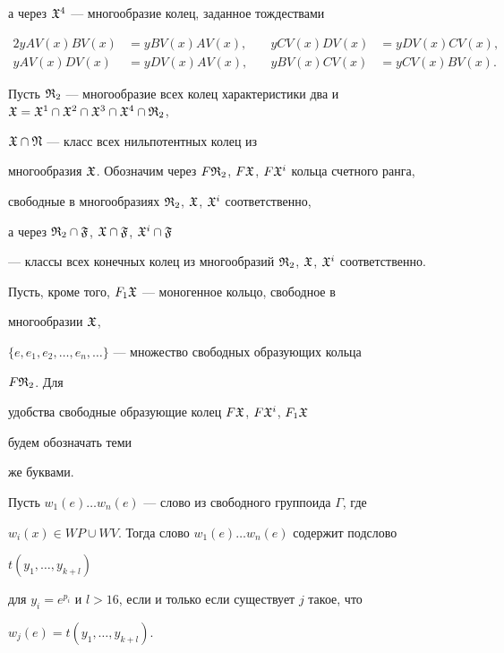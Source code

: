 а через $\frak X^4$ --- многообразие колец, заданное тождествами 


\begin{alignat*}{2} 


yAV(x)BV(x)&=yBV(x)AV(x), &\quad 


yCV(x)DV(x)&=yDV(x)CV(x), \\ 


yAV(x)DV(x)&=yDV(x)AV(x), &\quad yBV(x)CV(x)&=yCV(x)BV(x). 


\end{alignat*} 


 


 


Пусть $\frak R_2$ --- многообразие всех колец характеристики два и $\frak 


X=\frak X^1\cap\frak X^2\cap\frak X^3\cap\frak X^4\cap\frak R_2$, 


$\frak X\cap\frak N$ --- класс всех нильпотентных колец из 


многообразия $\frak X$. Обозначим через $F\frak R_2$, $F\frak X$, $F\frak 


X^i$ кольца счетного ранга, 


свободные в многообразиях $\frak R_2$, $\frak X$, $\frak X^i$ соответственно, 


а через $\frak R_2\cap\frak F$, $\frak X\cap\frak F$, $\frak X^i\cap\frak F$ 


--- классы всех конечных колец из многообразий $\frak R_2$, $\frak X$, $\frak 


X^i$ соответственно. 


Пусть, кроме того, $F_1\frak X$ --- моногенное кольцо, свободное в 


многообразии $\frak X$, 


$\{e,e_1,e_2,\dotsc,e_n,\dotsc\}$ --- множество свободных образующих кольца 


$F\frak R_2$. Для 


удобства свободные образующие колец $F\frak X$, $F\frak X^i$, $F_1\frak X$ 


будем обозначать теми 


же буквами. 


 


\begin{lem} 


Пусть $w_1(e)\dotsc w_n(e)$ --- слово из свободного группоида $\Gamma$, где 


$w_i(x)\in WP\cup WV$. Тогда слово $w_1(e)\dotsc w_n(e)$ содержит подслово 


$t(y_1,\dotsc,y_{k+l})$ 


для $y_i=e^{p_i}$ и $l>16$, если и только если существует $j$ такое, что 


$w_j(e)=t(y_1,\dotsc,y_{k+l})$. 


\end{lem} 


